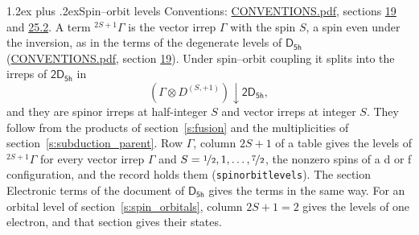 \documentclass[10pt,a4paper]{article}
\makeatletter
\renewcommand\section{\@startsection{section}{1}{\z@}{-3ex plus -1ex minus -.2ex}%
  {1.2ex plus .2ex}{\normalfont\large\sffamily\bfseries\color{parttitle}}}
\numberwithin{equation}{section}
\newcommand{\grp}[1]{\mathsf{#1}}
\newcommand{\restr}[2]{#1\!\downarrow#2}
\newcommand{\irrJp}[2]{D^{(#1,#2)}}
\newcommand{\irrprod}{\otimes}
\newcommand{\term}[2]{{}^{#1}#2}
\makeatother
\begin{document}
\section{Spin--orbit levels}\label{s:spin_orbit}
Conventions: \href{../../CONVENTIONS.pdf}{CONVENTIONS.pdf}, sections \href{../../../rotation/CONVENTIONS.pdf\#conv.19}{19} and \href{../../CONVENTIONS.pdf\#conv.25.2}{25.2}.
\leavevmode\label{n:local.spin}\label{n:symbol.term}A term $\term{2S+1}{\Gamma}$ is the vector irrep $\Gamma$ with the spin $S$, a spin even under the inversion, as in the terms of the degenerate levels of \href{../../../rotation/data/pdf/D5h.pdf}{$\grp{D_{5h}}$} (\href{../../CONVENTIONS.pdf}{CONVENTIONS.pdf}, section \href{../../../rotation/CONVENTIONS.pdf\#conv.19}{19}). Under spin--orbit coupling it splits into the irreps of $\grp{2D_{5h}}$ in
\begin{equation}\label{e:spinorbit}\restr{(\Gamma \irrprod \irrJp{S}{+1})}{\grp{2D_{5h}}},\end{equation}
and they are spinor irreps at half-integer $S$ and vector irreps at integer $S$. They follow from the products of section~\ref{s:fusion} and the multiplicities of section~\ref{s:subduction_parent}. Row $\Gamma$, column $2S + 1$ of a table gives the levels of $\term{2S+1}{\Gamma}$ for every vector irrep $\Gamma$ and $S = \nicefrac{1}{2}, 1, \dots, \nicefrac{7}{2}$, the nonzero spins of a d or f configuration, and the record holds them (\texttt{spinorbitlevels}). The section Electronic terms of the document of \href{../../../rotation/data/pdf/D5h.pdf}{$\grp{D_{5h}}$} gives the terms in the same way. For an orbital level of section~\ref{s:spin_orbitals}, column $2S + 1 = 2$ gives the levels of one electron, and that section gives their states.
\end{document}
